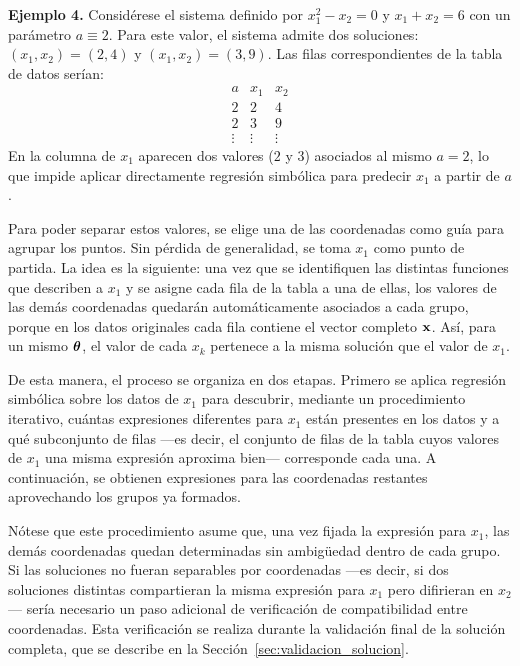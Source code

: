 \bigskip \noindent\textbf{Ejemplo 4.} Considérese el sistema definido por \(x_1^2 - x_2 = 0\) y \(x_1 + x_2 = 6\) con un parámetro \(a \equiv 2\). Para este valor, el sistema admite dos soluciones: \((x_1, x_2) = (2, 4)\) y \((x_1, x_2) = (3, 9)\). Las filas correspondientes de la tabla de datos serían: \[ \begin{array}{c|c|c}
a & x_1 & x_2 \\
\hline
2 & 2 & 4 \\
2 & 3 & 9 \\
\vdots & \vdots & \vdots \end{array} \] En la columna de \(x_1\) aparecen dos valores (\(2\) y \(3\)) asociados al mismo \(a = 2\), lo que impide aplicar directamente regresión simbólica para predecir \(x_1\) a partir de \(a\).

Para poder separar estos valores, se elige una de las coordenadas como guía para agrupar los puntos. Sin pérdida de generalidad, se toma \(x_1\) como punto de partida. La idea es la siguiente: una vez que se identifiquen las distintas funciones que describen a \(x_1\) y se asigne cada fila de la tabla a una de ellas, los valores de las demás coordenadas quedarán automáticamente asociados a cada grupo, porque en los datos originales cada fila contiene el vector completo \(\mathbf{x}\). Así, para un mismo \(\boldsymbol{\theta}\), el valor de cada \(x_k\) pertenece a la misma solución que el valor de \(x_1\).

De esta manera, el proceso se organiza en dos etapas. Primero se aplica regresión simbólica sobre los datos de \(x_1\) para descubrir, mediante un procedimiento iterativo, cuántas expresiones diferentes para \(x_1\) están presentes en los datos y a qué subconjunto de filas —es decir, el conjunto de filas de la tabla cuyos valores de \(x_1\) una misma expresión aproxima bien— corresponde cada una. A continuación, se obtienen expresiones para las coordenadas restantes aprovechando los grupos ya formados.

Nótese que este procedimiento asume que, una vez fijada la expresión para \(x_1\), las demás coordenadas quedan determinadas sin ambigüedad dentro de cada grupo. Si las soluciones no fueran separables por coordenadas —es decir, si dos soluciones distintas compartieran la misma expresión para \(x_1\) pero difirieran en \(x_2\)— sería necesario un paso adicional de verificación de compatibilidad entre coordenadas. Esta verificación se realiza durante la validación final de la solución completa, que se describe en la Sección~\ref{sec:validacion_solucion}.

